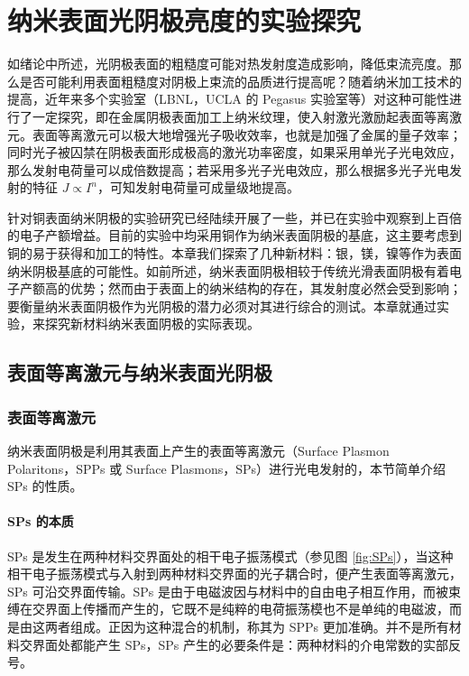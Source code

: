 \chapter{纳米表面光阴极亮度的实验探究}
\label{chap:NPC}

如绪论中所述，光阴极表面的粗糙度可能对热发射度造成影响，降低束流亮度。那么是否可能利用表面粗糙度对阴极上束流的品质进行提高呢？随着纳米加工技术的提高，近年来多个实验室（LBNL，UCLA 的 Pegasus 实验室等）对这种可能性进行了一定探究，即在金属阴极表面加工上纳米纹理，使入射激光激励起表面等离激元\cite{Polyakov:2013aa,Li:2013aa}。表面等离激元可以极大地增强光子吸收效率，也就是加强了金属的量子效率；同时光子被囚禁在阴极表面形成极高的激光功率密度，如果采用单光子光电效应，那么发射电荷量可以成倍数提高；若采用多光子光电效应，那么根据多光子光电发射的特征 $J \propto I^n$，可知发射电荷量可成量级地提高\cite{Li:2013aa}。

针对铜表面纳米阴极的实验研究已经陆续开展了一些\cite{Polyakov:2013aa,Li:2013aa}，并已在实验中观察到上百倍的电子产额增益\cite{Li:2013aa}。目前的实验中均采用铜作为纳米表面阴极的基底，这主要考虑到铜的易于获得和加工的特性。本章我们探索了几种新材料：银，镁，镍等作为表面纳米阴极基底的可能性。如前所述，纳米表面阴极相较于传统光滑表面阴极有着电子产额高的优势；然而由于表面上的纳米结构的存在，其发射度必然会受到影响；要衡量纳米表面阴极作为光阴极的潜力必须对其进行综合的测试。本章就通过实验，来探究新材料纳米表面阴极的实际表现。

\section{表面等离激元与纳米表面光阴极}
\subsection{表面等离激元}
纳米表面阴极是利用其表面上产生的表面等离激元（Surface Plasmon Polaritons，SPPs 或 Surface Plasmons，SPs）进行光电发射的，本节简单介绍 SPs 的性质。
\subsubsection{SPs 的本质}
SPs 是发生在两种材料交界面处的相干电子振荡模式（参见图 \ref{fig:SPs}）\cite{Ritchie:1957aa}，当这种相干电子振荡模式与入射到两种材料交界面的光子耦合时，便产生表面等离激元，SPs 可沿交界面传输。SPs 是由于电磁波因与材料中的自由电子相互作用，而被束缚在交界面上传播而产生的，它既不是纯粹的电荷振荡模也不是单纯的电磁波，而是由这两者组成。正因为这种混合的机制，称其为 SPPs 更加准确。并不是所有材料交界面处都能产生 SPs，SPs 产生的必要条件是：两种材料的介电常数的实部反号。

